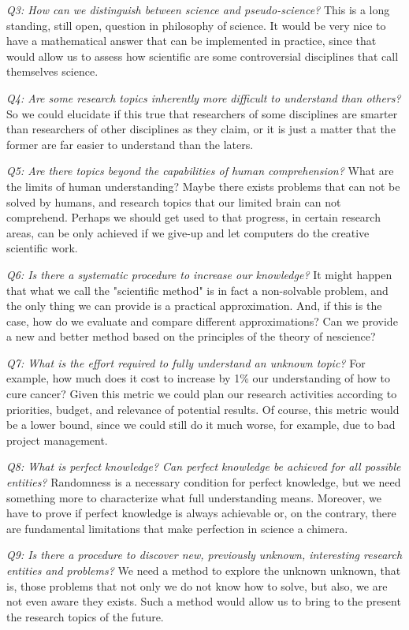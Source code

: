 \emph{Q3: How can we distinguish between science and pseudo-science?} This is a long standing, still open, question in philosophy of science. It would be very nice to have a mathematical answer that can be implemented in practice, since that would allow us to assess how scientific are some controversial disciplines that call themselves science.

\emph{Q4: Are some research topics inherently more difficult to understand than others?} So we could elucidate if this true that researchers of some disciplines are smarter than researchers of other disciplines as they claim, or it is just a matter that the former are far easier to understand than the laters.

\emph{Q5: Are there topics beyond the capabilities of human comprehension?} What are the limits of human understanding? Maybe there exists problems that can not be solved by humans, and research topics that our limited brain can not comprehend. Perhaps we should get used to that progress, in certain research areas, can be only achieved if we give-up and let computers do the creative scientific work.

\emph{Q6: Is there a systematic procedure to increase our knowledge?} It might happen that what we call the "scientific method" is in fact a non-solvable problem, and the only thing we can provide is a practical approximation. And, if this is the case, how do we evaluate and compare different approximations? Can we provide a new and better method based on the principles of the theory of nescience?

\emph{Q7: What is the effort required to fully understand an unknown topic?} For example, how much does it cost to increase by 1\% our understanding of how to cure cancer? Given this  metric we could plan our research activities according to priorities, budget, and relevance of potential results. Of course, this metric would be a lower bound, since we could still do it much worse, for example, due to bad project management.

\emph{Q8: What is perfect knowledge? Can perfect knowledge be achieved for all possible entities?} Randomness is a necessary condition for perfect knowledge, but we need something more to characterize what full understanding means. Moreover, we have to prove if perfect knowledge is always achievable or, on the contrary, there are fundamental limitations that make perfection in science a chimera. 

\emph{Q9: Is there a procedure to discover new, previously unknown, interesting research entities and problems?} We need a method to explore the unknown unknown, that is, those problems that not only we do not know how to solve, but also, we are not even aware they exists. Such a method would allow us to bring to the present the research topics of the future.

